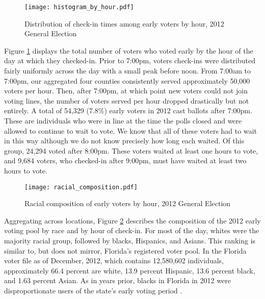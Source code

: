 \documentclass[12pt,titlepage]{article}
\begin{document}
\begin{figure}[!ht]
\caption{Distribution of check-in times among early voters by hour, 2012
  General Election}
  \label{fig:hist2012}
  \centering
    \centering\texttt{[image: histogram\_by\_hour.pdf]}
\end{figure}

Figure \ref{fig:hist2012} displays the total number of voters who
voted early by the hour of the day at which they checked-in. Prior to
7:00pm, voters check-ins were distributed fairly uniformly across the
day with a small peak before noon.  From 7:00am to 7:00pm, our
aggregated four counties consistently served approximately 50,000
voters per hour. Then, after 7:00pm, at which point new voters could
not join voting lines, the number of voters served per hour dropped
drastically but not entirely.  A total of 54,329 (7.8\%) early voters
in 2012 cast ballots after 7:00pm. These are individuals who were in
line at the time the polls closed and were allowed to continue to wait
to vote.  We know that all of these voters had to wait in this way
although we do not know precisely how long each waited.  Of this
group, 24,294 voted after 8:00pm.  These voters waited at least one
hours to vote, and 9,684 voters, who checked-in after 9:00pm, must
have waited at least two hours to vote.




\begin{figure}[!ht]
\caption{Racial composition of early voters by hour, 2012 General Election}
  \label{fig:race2012}
  \centering
    \centering\texttt{[image: racial\_composition.pdf]}
\end{figure}

Aggregating across locations, Figure \ref{fig:race2012} describes the
composition of the 2012 early voting pool by race and by hour of
check-in.  For most of the day, whites were the majority racial group,
followed by blacks, Hispanics, and Asians.  This ranking is similar
to, but does not mirror, Florida's registered voter pool.  In the
Florida voter file as of December, 2012, which contains 12,580,602
individuals, approximately 66.4 percent are white, 13.9 percent
Hispanic, 13.6 percent black, and 1.63 percent Asian.  As in years
prior, blacks in Florida in 2012 were disproportionate users of the
state's early voting period \citep{herronsmith:souls}.
\end{document}
